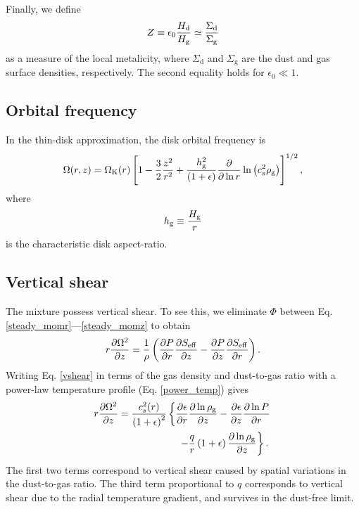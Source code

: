 Finally, we define 
\begin{align}
  Z \equiv \epsilon_0\frac{H_\mathrm{d}}{H_\mathrm{g}} \simeq
  \frac{\Sigma_\mathrm{d}}{\Sigma_\mathrm{g}} 
\end{align}
as a measure of the local metalicity, where $\Sigma_\mathrm{d}$ and
$\Sigma_\mathrm{g}$ are the dust and gas surface densities,
respectively. The second equality holds for $\epsilon_0\ll1$.  


\subsection{Orbital frequency} 
In the thin-disk approximation, the disk orbital frequency is 
\begin{align}
  \Omega(r,z) = \Omega_{\rm K}(r)\left[1 - \frac{3}{2}\frac{z^2}{r^2} +
    \frac{h_\mathrm{g}^2}{\left(1+\epsilon\right)}\frac{\partial}{\partial\ln{r}}\ln{\left(c_s^2\rho_\mathrm{g}\right)}
    \right]^{1/2}, 
\end{align}
where 
\begin{align}
  h_\mathrm{g} \equiv \frac{H_\mathrm{g}}{r}
\end{align}
is the characteristic disk aspect-ratio. 

\subsection{Vertical shear}\label{vertshear}
The mixture possess vertical shear. To see this, we eliminate $\Phi$
between Eq. \ref{steady_momr}---\ref{steady_momz} to 
obtain 
\begin{align}\label{vshear}
  r\frac{\partial \Omega^2}{\partial z} 
   = \frac{1}{\rho}\left(\frac{\partial P}{\partial r}\frac{\partial S_\mathrm{eff}}{\partial z} -\frac{\partial
    P}{\partial z}\frac{\partial S_\mathrm{eff}}{\partial r} \right). 
\end{align}
Writing Eq. \ref{vshear} in terms of the gas density and dust-to-gas
ratio with a power-law temperature profile (Eq. \ref{power_temp}) gives 
\begin{align}\label{vshear2}
  &r\frac{\p \Omega^2}{\p z}  =
  \frac{c_s^2(r)}{\left(1+\epsilon\right)^2}\left\{
  \frac{\p\epsilon}{\p r}\frac{\p\ln{\rhog}}{\p z}
 -\frac{\p\epsilon}{\p z}\frac{\p\ln{P}}{\p r}\right.\notag\\
  &\phantom{ r\frac{\p \Omega^2}{\p z}  =
    \frac{c_s^2(r)}{\left(1+\epsilon\right)^2}\left\{\right\} }
  \left. -\frac{q}{r} \left(1+\epsilon\right)\frac{\p\ln{\rhog}}{\p z}
  \right\}. 
\end{align}
The first two terms correspond to vertical shear caused by spatial
variations in the dust-to-gas ratio. The third term
proportional to $q$ corresponds to vertical shear due to the 
radial temperature gradient, and survives in the dust-free limit. 

